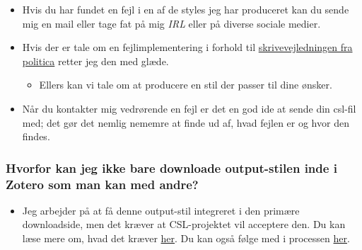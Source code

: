 \documentclass[
  a4paper,
  DIV=11,
  numbers=noendperiod,
  oneside]{scrartcl}
\providecommand{\tightlist}{%
  \setlength{\itemsep}{0pt}\setlength{\parskip}{0pt}}\usepackage{longtable,booktabs,array}
\begin{document}
\begin{itemize}
\tightlist
\item
  Hvis du har fundet en fejl i en af de styles jeg har produceret kan du
  sende mig en mail eller tage fat på mig \emph{IRL} eller på diverse
  sociale medier.
\item
  Hvis der er tale om en fejlimplementering i forhold til
  \href{https://politica.dk/bidrag-til-politica/skrivevejledning-for-politica/}{skrivevejledningen
  fra politica} retter jeg den med glæde.

  \begin{itemize}
  \tightlist
  \item
    Ellers kan vi tale om at producere en stil der passer til dine
    ønsker.
  \end{itemize}
\item
  Når du kontakter mig vedrørende en fejl er det en god ide at sende din
  csl-fil med; det gør det nemlig nememre at finde ud af, hvad fejlen er
  og hvor den findes.
\end{itemize}

\subsubsection{Hvorfor kan jeg ikke bare downloade output-stilen inde i
Zotero som man kan med
andre?}\label{hvorfor-kan-jeg-ikke-bare-downloade-output-stilen-inde-i-zotero-som-man-kan-med-andre}

\begin{itemize}
\tightlist
\item
  Jeg arbejder på at få denne output-stil integreret i den primære
  downloadside, men det kræver at CSL-projektet vil acceptere den. Du
  kan læse mere om, hvad det kræver
  \href{https://github.com/citation-style-language/styles/blob/master/README.md\#criteria-for-inclusion}{her}.
  Du kan også følge med i processen
  \href{https://github.com/citation-style-language/styles/pull/6797}{her}.
\end{itemize}
\end{document}
